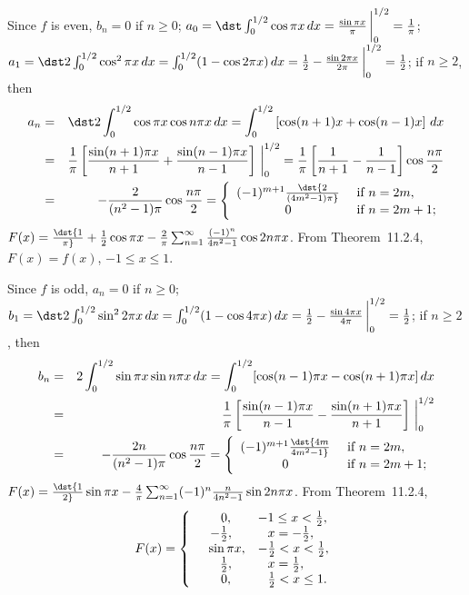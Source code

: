 \documentclass[dvips]{book}
\renewcommand{\exer}[1]{\par\medskip\;\noindent{\color{red}\bf #1.}}
\numberwithin{example}{section}
\numberwithin{equation}{section}
\numberwithin{theorem}{section}
\numberwithin{table}{section}
\numberwithin{figure}{section}
\newcommand{\lims}[2]{\,\bigg|_{#1}^{#2}}
\begin{document}
\exer{11.2.10}
Since $f$ is even,
$b_n=0$ if $n\ge0$; $a_0=\dst\int_0^{1/2}\cos\pi
x\,dx={\sin\pi x\over\pi}\lims0{1/2}={1\over\pi}$;
$a_1=\dst2\int_0^{1/2}\cos^2\pi
x\,dx=\int_0^{1/2}(1-\cos2\pi
x)\,dx={1\over2}-{\sin2\pi x\over2\pi}\lims0{1/2}={1\over2}$; if
$n\ge2$, then
\begin{eqnarray*}
a_n&=&\dst2\int_0^{1/2}\cos\pi x\cos n\pi
x\,dx=\int_0^{1/2}\left[\cos(n+1)x+\cos(n-1)x\right]\,dx\\
&=&{1\over\pi}\left[{\sin(n+1)\pi x\over n+1}+
{\sin(n-1)\pi x\over n-1}\right]\lims0{1/2}=
{1\over\pi}\left[{1\over n+1}-{1\over n-1}\right]\cos{n\pi\over2}\\
&=&-{2\over(n^2-1)\pi}\cos{n\pi\over2}
=\left\{\begin{array}{cl}
(-1)^{m+1}\dst{2\over(4m^2-1)\pi}&\mbox{ if }n=2m,\\
0&\mbox{ if }n=2m+1;
\end{array}\right.
\end{eqnarray*}
$F(x)=\dst{1\over\pi}+{1\over2}\cos\pi x-{2\over\pi}\sum_{n=1}^\infty
{(-1)^n\over4n^2-1}\cos2n\pi x$.
 From Theorem~11.2.4,
$F(x)=f(x)$, $-1\le x\le1$.





\exer{11.2.12}
Since $f$ is odd,
$a_n=0$ if $n\ge0$;
$b_1=\dst2\int_0^{1/2}\sin^22\pi
x\,dx=\int_0^{1/2}(1-\cos4\pi
x)\,dx=\\{1\over2}-{\sin4\pi x\over4\pi}\lims0{1/2}={1\over2}$; if
$n\ge2$, then
\begin{eqnarray*}
b_n&=&2\int_0^{1/2}\sin\pi x\sin n\pi x\,dx=
\int_0^{1/2}[\cos(n-1)\pi x-\cos(n+1)\pi x]\,dx\\
&=&{1\over\pi}\left[{\sin(n-1)\pi x\over n-1}-
{\sin(n+1)\pi x\over n+1}\right]\lims0{1/2}\\
&=&-{2n\over(n^2-1)\pi}\cos{n\pi\over2}=
\left\{\begin{array}{cl}
(-1)^{m+1}\dst{4m\over4m^2-1}&\mbox{ if }n=2m,\\
0&\mbox{ if }n=2m+1;
\end{array}\right.
\end{eqnarray*}
$F(x)=\dst{1\over2}\sin\pi x-{4\over\pi}\sum_{n=1}^\infty
(-1)^n{n\over4n^2-1}\sin2n\pi x$.
 From Theorem~11.2.4,
$$
F(x)=
\left\{\begin{array}{cl}
\phantom{-}0,&-1\le x<{1\over2},\\
-{1\over2},&\phantom{-}x=-{1\over2},\\
\phantom{-}\sin\pi x,&-{1\over2}<x<{1\over2},\\
\phantom{-}{1\over2},&\phantom{-}x={1\over2},\\
\phantom{-}0,&\phantom{-}{1\over2}<x\le1.
\end{array}\right.
$$
\end{document}
